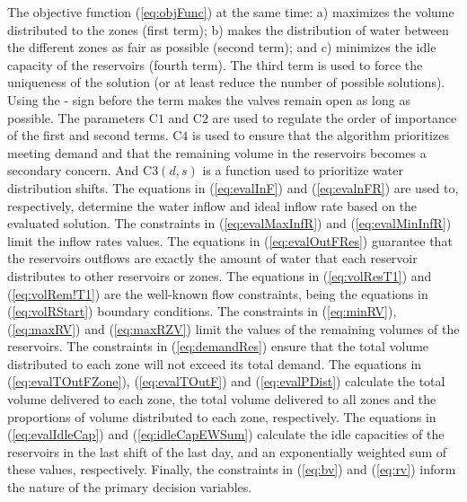 \documentclass{singlecol}
\theoremstyle{TH}{
\newtheorem{lemma}{Lemma}
\newtheorem{theorem}[lemma]{Theorem}
\newtheorem{corrolary}[lemma]{Corrolary}
\newtheorem{conjecture}[lemma]{Conjecture}
\newtheorem{proposition}[lemma]{Proposition}
\newtheorem{claim}[lemma]{Claim}
\newtheorem{stheorem}[lemma]{Wrong Theorem}
\newtheorem{algorithm}{Algorithm}
}
\theoremstyle{THrm}{
\newtheorem{definition}{Definition}[section]
\newtheorem{question}{Question}[section]
\newtheorem{remark}{Remark}
\newtheorem{scheme}{Scheme}
}
\theoremstyle{THhit}{
\newtheorem{case}{Case}[section]
}
\begin{document}
The objective function (\ref{eq:objFunc}) at the same time: a) maximizes the volume distributed to the zones (first term); b) makes the distribution of water between the different zones as fair as possible (second term); and c) minimizes the idle capacity of the reservoirs (fourth term). The third term is used to force the uniqueness of the solution (or at least reduce the number of possible solutions). Using the - sign before the term makes the valves \footnotemark[1] remain open as long as possible. The parameters $\mathrm{C1}$ and $\mathrm{C2}$ are used to regulate the order of importance of the first and second terms. $\mathrm{C4}$ is used to ensure that the algorithm prioritizes meeting demand and that the remaining volume in the reservoirs becomes a secondary concern. And $\mathrm{C3}(d,s)$ is a function used to prioritize water distribution shifts. The equations in (\ref{eq:evalInF}) and (\ref{eq:evalnFR}) are used to, respectively, determine the water inflow and ideal inflow rate based on the evaluated solution. The constraints in (\ref{eq:evalMaxInfR}) and (\ref{eq:evalMinInfR}) limit the inflow rates values. The equations in (\ref{eq:evalOutFRes}) guarantee that the reservoirs outflows are exactly the amount of water that each reservoir distributes to other reservoirs or zones\footnotemark[2] . The equations in (\ref{eq:volResT1}) and (\ref{eq:volRem!T1}) are the well-known flow constraints, being the equations in (\ref{eq:volRStart}) boundary conditions. The constraints in (\ref{eq:minRV}), (\ref{eq:maxRV}) and (\ref{eq:maxRZV}) limit the values of the remaining volumes of the reservoirs. The constraints in (\ref{eq:demandRes}) ensure that the total volume distributed to each zone will not exceed its total demand. The equations in (\ref{eq:evalTOutFZone}), (\ref{eq:evalTOutF}) and (\ref{eq:evalPDist}) calculate the total volume delivered to each zone, the total volume delivered to all zones and the proportions of volume distributed to each zone, respectively. The equations in (\ref{eq:evalIdleCap}) and (\ref{eq:idleCapEWSum}) calculate the idle capacities of the reservoirs in the last shift of the last day, and an exponentially weighted sum of these values, respectively. Finally, the constraints in (\ref{eq:bv}) and (\ref{eq:rv}) inform the nature of the primary decision variables.
\end{document}
